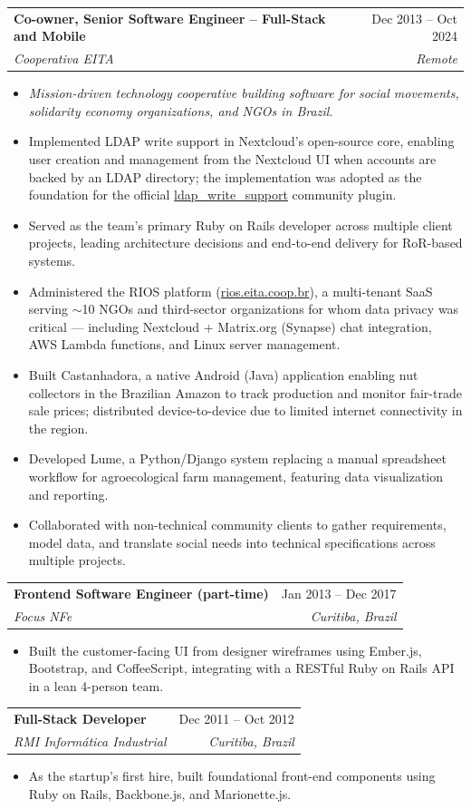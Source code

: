 \documentclass[letterpaper,11pt]{article}
\makeatletter
\newcommand{\resumeItem}[1]{
  \item\small{#1 \vspace{-2pt}}
}
\newcommand{\resumeSubheading}[4]{
  \vspace{-2pt}\item
    \begin{tabular*}{0.97\textwidth}[t]{l@{\extracolsep{\fill}}r}
      \textbf{#1} & #2 \\
      \textit{\small#3} & \textit{\small #4} \\
    \end{tabular*}\vspace{-7pt}
}
\newcommand{\resumeDescription}[1]{%
  \begin{itemize}[leftmargin=0.15in, label={}]
    \item\small{\textit{#1}}
  \end{itemize}\vspace{-10pt}
}
\newcommand{\resumeItemListStart}{\begin{itemize}}
\newcommand{\resumeItemListEnd}{\end{itemize}\vspace{-5pt}}
\makeatother
\begin{document}
  \resumeSubheading
    {Co-owner, Senior Software Engineer -- Full-Stack and Mobile}{Dec 2013 -- Oct 2024}
    {Cooperativa EITA}{Remote}
  \resumeDescription{Mission-driven technology cooperative building software for social movements, solidarity economy organizations, and NGOs in Brazil.}
  \resumeItemListStart
    \resumeItem{Implemented LDAP write support in Nextcloud's open-source core, enabling user creation and management from the Nextcloud UI when accounts are backed by an LDAP directory; the implementation was adopted as the foundation for the official \href{https://apps.nextcloud.com/apps/ldap_write_support}{ldap\_write\_support} community plugin.}
    \resumeItem{Served as the team's primary Ruby on Rails developer across multiple client projects, leading architecture decisions and end-to-end delivery for RoR-based systems.}
    \resumeItem{Administered the RIOS platform (\href{https://rios.eita.coop.br}{rios.eita.coop.br}), a multi-tenant SaaS serving $\sim$10 NGOs and third-sector organizations for whom data privacy was critical --- including Nextcloud + Matrix.org (Synapse) chat integration, AWS Lambda functions, and Linux server management.}
    \resumeItem{Built Castanhadora, a native Android (Java) application enabling nut collectors in the Brazilian Amazon to track production and monitor fair-trade sale prices; distributed device-to-device due to limited internet connectivity in the region.}
    \resumeItem{Developed Lume, a Python/Django system replacing a manual spreadsheet workflow for agroecological farm management, featuring data visualization and reporting.}
    \resumeItem{Collaborated with non-technical community clients to gather requirements, model data, and translate social needs into technical specifications across multiple projects.}
  \resumeItemListEnd

  \resumeSubheading
    {Frontend Software Engineer (part-time)}{Jan 2013 -- Dec 2017}
    {Focus NFe}{Curitiba, Brazil}
  \resumeItemListStart
    \resumeItem{Built the customer-facing UI from designer wireframes using Ember.js, Bootstrap, and CoffeeScript, integrating with a RESTful Ruby on Rails API in a lean 4-person team.}
  \resumeItemListEnd

  \resumeSubheading
    {Full-Stack Developer}{Dec 2011 -- Oct 2012}
    {RMI Informática Industrial}{Curitiba, Brazil}
  \resumeItemListStart
    \resumeItem{As the startup's first hire, built foundational front-end components using Ruby on Rails, Backbone.js, and Marionette.js.}
  \resumeItemListEnd
\end{document}
